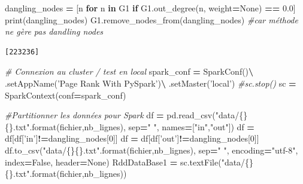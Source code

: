 \documentclass[10pt,a4paper]{article}
\newenvironment{Shaded}{\begin{snugshade}}{\end{snugshade}}
\newcommand{\BuiltInTok}[1]{#1}
\newcommand{\CommentTok}[1]{\textcolor[rgb]{0.56,0.35,0.01}{\textit{#1}}}
\newcommand{\ControlFlowTok}[1]{\textcolor[rgb]{0.13,0.29,0.53}{\textbf{#1}}}
\newcommand{\DecValTok}[1]{\textcolor[rgb]{0.00,0.00,0.81}{#1}}
\newcommand{\FloatTok}[1]{\textcolor[rgb]{0.00,0.00,0.81}{#1}}
\newcommand{\KeywordTok}[1]{\textcolor[rgb]{0.13,0.29,0.53}{\textbf{#1}}}
\newcommand{\NormalTok}[1]{#1}
\newcommand{\OperatorTok}[1]{\textcolor[rgb]{0.81,0.36,0.00}{\textbf{#1}}}
\newcommand{\SpecialCharTok}[1]{\textcolor[rgb]{0.00,0.00,0.00}{#1}}
\newcommand{\StringTok}[1]{\textcolor[rgb]{0.31,0.60,0.02}{#1}}
\newcommand{\VariableTok}[1]{\textcolor[rgb]{0.00,0.00,0.00}{#1}}
\theoremstyle{break}
\begin{document}
\begin{Shaded}
\begin{Highlighting}[]
\NormalTok{dangling_nodes }\OperatorTok{=}\NormalTok{ [n }\ControlFlowTok{for}\NormalTok{ n }\KeywordTok{in}\NormalTok{ G1 }\ControlFlowTok{if}\NormalTok{ G1.out_degree(n, weight}\OperatorTok{=}\VariableTok{None}\NormalTok{) }\OperatorTok{==} \FloatTok{0.0}\NormalTok{] }
\BuiltInTok{print}\NormalTok{(dangling_nodes)}
\NormalTok{G1.remove_nodes_from(dangling_nodes) }\CommentTok{#car méthode ne gère pas dandling nodes}
\end{Highlighting}
\end{Shaded}

\begin{verbatim}
[223236]
\end{verbatim}

\begin{Shaded}
\begin{Highlighting}[]
\CommentTok{# Connexion au cluster / test en local}
\NormalTok{spark_conf }\OperatorTok{=}\NormalTok{ SparkConf()}\OperatorTok{\textbackslash{}}
\NormalTok{    .setAppName(}\StringTok{'Page Rank With PySpark'}\NormalTok{)}\OperatorTok{\textbackslash{}}
\NormalTok{    .setMaster(}\StringTok{'local'}\NormalTok{)}
\CommentTok{#sc.stop()}
\NormalTok{sc }\OperatorTok{=}\NormalTok{ SparkContext(conf}\OperatorTok{=}\NormalTok{spark_conf)}

\CommentTok{#Partitionner les données pour Spark}
\NormalTok{df }\OperatorTok{=}\NormalTok{ pd.read_csv(}\StringTok{"data/}\SpecialCharTok{\{\}\{\}}\StringTok{.txt"}\NormalTok{.}\BuiltInTok{format}\NormalTok{(fichier,nb_lignes),}
\NormalTok{                           sep}\OperatorTok{=}\StringTok{" "}\NormalTok{, names}\OperatorTok{=}\NormalTok{[}\StringTok{"in"}\NormalTok{,}\StringTok{"out"}\NormalTok{]) }
\NormalTok{df }\OperatorTok{=}\NormalTok{ df[df[}\StringTok{'in'}\NormalTok{]}\OperatorTok{!=}\NormalTok{dangling_nodes[}\DecValTok{0}\NormalTok{]]}
\NormalTok{df }\OperatorTok{=}\NormalTok{ df[df[}\StringTok{'out'}\NormalTok{]}\OperatorTok{!=}\NormalTok{dangling_nodes[}\DecValTok{0}\NormalTok{]]}
\NormalTok{df.to_csv(}\StringTok{"data/}\SpecialCharTok{\{\}\{\}}\StringTok{.txt"}\NormalTok{.}\BuiltInTok{format}\NormalTok{(fichier,nb_lignes), sep}\OperatorTok{=}\StringTok{" "}\NormalTok{,}
\NormalTok{          encoding}\OperatorTok{=}\StringTok{"utf-8"}\NormalTok{, index}\OperatorTok{=}\VariableTok{False}\NormalTok{, header}\OperatorTok{=}\VariableTok{None}\NormalTok{)}
\NormalTok{RddDataBase1 }\OperatorTok{=}\NormalTok{ sc.textFile(}\StringTok{"data/}\SpecialCharTok{\{\}\{\}}\StringTok{.txt"}\NormalTok{.}\BuiltInTok{format}\NormalTok{(fichier,nb_lignes))}
\end{Highlighting}
\end{Shaded}
\end{document}
